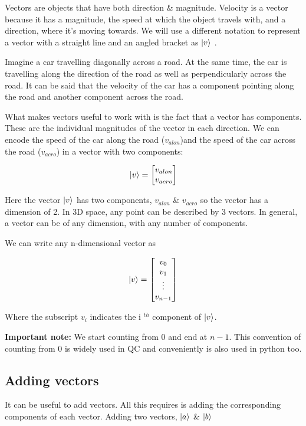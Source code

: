 \documentclass{book}
\begin{document}
Vectors are objects that have both direction \& magnitude. Velocity is a vector because it has a magnitude, the speed at which the object travels with, and a direction, where it's moving towards. We will use a different notation to represent a vector with a straight line and an angled bracket as $ \ket{v} $ .

Imagine a car travelling diagonally across a road. At the same time, the car is travelling along the direction of the road as well as perpendicularly across the road. It can be said that the velocity of the car has a component pointing along the road and another component across the road. 

What makes vectors useful to work with is the fact that a vector has components. These are the individual magnitudes of the vector in each direction. We can encode the speed of the car along the road ($v_{alon}$)and the speed of the car across the road ($v_{acro}$) in a vector with two components: 

$$
\ket{v} = \begin{bmatrix}v_{alon} \\ v_{acro}
\end{bmatrix}
$$

Here the vector $\ket{v}$ has two components, $v_{alon}$ \& $v_{acro}$ so the vector has a dimension of 2. In 3D space, any point can be described by 3 vectors. In general, a vector can be of any dimension, with any number of components. 

We can write any n-dimensional vector as

$$
\ket{v} = \begin{bmatrix} v_0 \\ v_1 \\ \vdots \\ v_{n-1} \end{bmatrix}
$$

Where the subscript $v_i$ indicates the i $^{th}$ component of $\ket{v}$. 

\textbf{Important note:} We start counting from 0 and end at $n-1$. This convention of counting from 0 is widely used in QC and conveniently is also used in python too. 

\subsection{ Adding vectors }

It can be useful to add vectors. All this requires is adding the corresponding components of each vector. Adding two vectors, $\ket{a}$ \& $\ket{b}$
\end{document}
